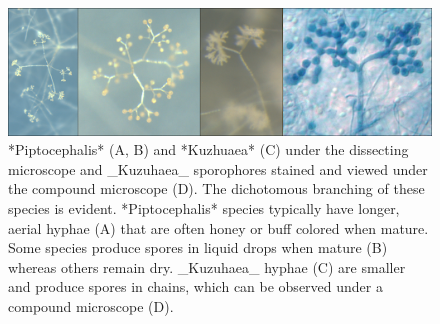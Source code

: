 \documentclass[]{book}
\begin{document}
\begin{figure}

{\centering \includegraphics[width=6.83in]{img/Fig5_Ch2} 

}

\caption{*Piptocephalis* (A, B) and *Kuzhuaea* (C) under the dissecting microscope and _Kuzuhaea_ sporophores stained and viewed under the compound microscope (D).  The dichotomous branching of these species is evident.  *Piptocephalis* species typically have longer, aerial hyphae (A) that are often honey or buff colored when mature.  Some species produce spores in liquid drops when mature (B) whereas others remain dry.  _Kuzuhaea_ hyphae (C) are smaller and produce spores in chains, which can be observed under a compound microscope (D).}\label{fig:ch2fig5}
\end{figure}
\end{document}
